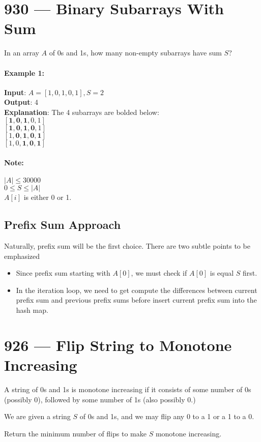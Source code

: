 \section{930 --- Binary Subarrays With Sum}
In an array $A$ of 0s and 1s, how many non-empty subarrays have sum $S$?
\paragraph{Example 1:}
\begin{flushleft}
\textbf{Input}: $A = [1,0,1,0,1], S = 2$
\\
\textbf{Output}: 4
\\
\textbf{Explanation}: The 4 subarrays are bolded below:
\\
$[\mathbf{1,0,1},0,1]$
\\
$[\mathbf{1,0,1,0},1]$
\\
$[1,\mathbf{0,1,0,1}]$
\\
$[1,0,\mathbf{1,0,1}]$
\end{flushleft}
\paragraph{Note:}
\begin{flushleft}
$|A| \leq 30000$
\\
$0 \leq S \leq |A|$
\\
$A[i]$ is either 0 or 1.
\subsection{Prefix Sum Approach}
Naturally, prefix sum will be the first choice. There are two subtle points to be emphasized 
\begin{itemize}
    \item Since prefix sum starting with $A[0]$, we must check if $A[0]$ is equal $S$ first.
    \item In the iteration loop, we need to get compute the differences between current prefix sum and previous prefix sums before insert current prefix sum into the hash map.
\end{itemize}
\end{flushleft}

\section{926 --- Flip String to Monotone Increasing}
A string of 0s and 1s is monotone increasing if it consists of some number of 0s (possibly 0), followed by some number of 1s (also possibly 0.)
\par
We are given a string $S$ of 0s and 1s, and we may flip any 0 to a 1 or a 1 to a 0.
\par
Return the minimum number of flips to make $S$ monotone increasing.
